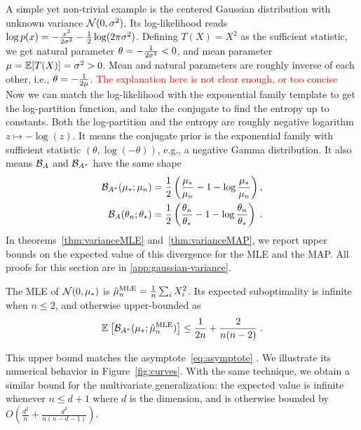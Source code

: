 \documentclass[twoside]{article}
\newcommand*{\expect}[2][]{\ensuremath{\mathbb{E}_{#1} \left[ #2 \right] }} %
\newcommand{\logpart}{A}
\newcommand{\conj}{\logpart^*}
\newcommand{\bregman}{\cB_\logpart}
\newcommand{\bregmanconj}{\cB_{\logpart^*}}
\newcommand{\nat}{\theta}
\newcommand{\m}{\mu}
\begin{document}
A simple yet non-trivial example is the centered Gaussian distribution with unknown variance ${\mathcal N}(0,\sigma^2)$.
Its log-likelihood reads $\log p(x) = -\frac{x^2}{2 \sigma^2} - \frac{1}{2}\log(2\pi \sigma^2)$.
Defining $T(X)=X^2$ as the sufficient statistic, we get natural parameter $\nat = -\inv{2 \sigma^2} <0$, and mean parameter $\m=\E[T(X)] = \sigma^2 >0$.
Mean and natural parameters are roughly inverse of each other, i.e., $\nat = -\inv{2 \m}$.
\textcolor{red}{The explanation here is not clear enough, or too concise} 
Now we can match the log-likelihood with the exponential family template to get the log-partition function, and take the conjugate to find the entropy
\aligns{
	\logpart (\nat) = - \half \log(-\nat) \quad\text{and}\quad
	\conj(\m) = - \half \log(\m)  \; ,
}
up to constants.
Both the log-partition and  the entropy are roughly negative logarithm $z\mapsto - \log(z)$.
It means the conjugate prior is the exponential family with sufficient statistic $(\nat, \log(-\nat) )$, e.g., a negative Gamma distribution.
It also means $\bregman$ and $\bregmanconj$ have the same shape
\begin{align}
	\bregmanconj( \m_*; \m_n)
	&= \half \left ( \frac{\m_*}{ \m_n} - 1 - \log  \frac{\m_*}{ \m_n} \right), \\
	\bregman( \nat_n; \nat_* )
	&=  \half \left ( \frac{ \nat_n}{\nat_*} - 1 - \log  \frac{ \nat_n}{\nat_*} \right) \; .
\end{align}
In theorems~\ref{thm:varianceMLE} and~\ref{thm:varianceMAP}, we report upper bounds on the expected value of this divergence for the MLE and the MAP.
All proofs for this section are in \cref{app:gaussian-variance}.
\begin{theorem}
\label{thm:varianceMLE}
	The MLE of $\cN(0,\m_*)$ is $\hat \m_n^\text{MLE} = \inv{n} \sum_i X_i^2 $.
	Its expected suboptimality is infinite when $n\leq 2$, and otherwise upper-bounded as
	\begin{align}
		 \expect{\bregmanconj( \m_*; \hat \m_n^\text{MLE}) }
			\leq \inv{2n} +\frac{2}{n(n-2)} \; .
			\label{eq:MLE_rate}
	\end{align}
\end{theorem}
This upper bound matches the asymptote~\eqref{eq:asymptote} .
We illustrate its numerical behavior in Figure~\ref{fig:curves}.
With the same technique, we obtain a similar bound for the multivariate generalization: the expected value is infinite whenever $n \leq d+1$ where $d$ is the dimension, and is otherwise bounded by $O(\frac{d^2}{n} + \frac{d^3}{n(n-d-1)} )$.
\end{document}
